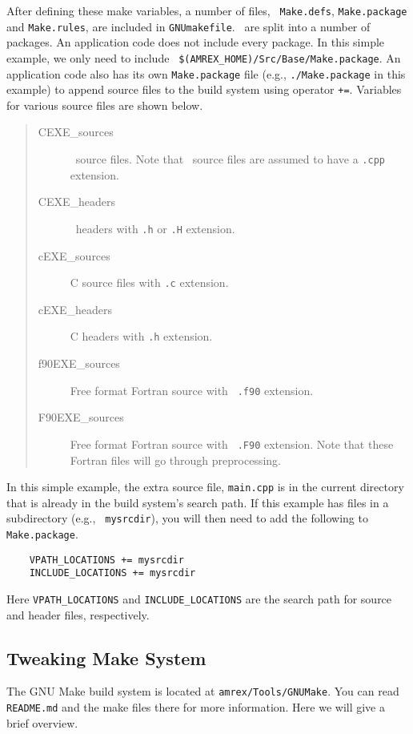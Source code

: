 After defining these make variables, a number of files, {\tt
  Make.defs}, {\tt Make.package} and {\tt Make.rules}, are included in
{\tt GNUmakefile}.  \amrex\ are split into a number of packages.  An
application code does not include every package.  In this simple
example, we only need to include {\tt
  \$(AMREX\_HOME)/Src/Base/Make.package}.  An application code also
has its own {\tt Make.package} file (e.g., {\tt ./Make.package} in
this example) to append source files to the build system using
operator {\tt +=}.  Variables for various source files are shown
below.
\begin{quote}
\begin{description}
\item [{CEXE\_sources}] \cpp\ source files.  Note that \cpp\
  source files are assumed to have a {\tt .cpp} extension.
\item [{CEXE\_headers}] \cpp\ headers with {\tt .h} or {\tt .H} extension.
\item [{cEXE\_sources}] C source files with {\tt .c} extension.
\item [{cEXE\_headers}] C headers with {\tt .h} extension.
\item [{f90EXE\_sources}] Free format Fortran source with {\tt
    .f90} extension.
\item [{F90EXE\_sources}] Free format Fortran source with {\tt
    .F90} extension.  Note that these Fortran files will go through
  preprocessing.
\end{description}
\end{quote}
In this simple example, the extra source file, {\tt main.cpp} is in
the current directory that is already in the build system's search
path.  If this example has files in a subdirectory (e.g., {\tt
  mysrcdir}), you will then need to add the following to {\tt
  Make.package}. 
\begin{verbatim}
    VPATH_LOCATIONS += mysrcdir
    INCLUDE_LOCATIONS += mysrcdir
\end{verbatim}
Here {\tt VPATH\_LOCATIONS} and {\tt INCLUDE\_LOCATIONS} are the search
path for source and header files, respectively.

\subsection{Tweaking Make System}

The GNU Make build system is located at {\tt amrex/Tools/GNUMake}.
You can read {\tt README.md} and the make files there for more
information.  Here we will give a brief overview.

